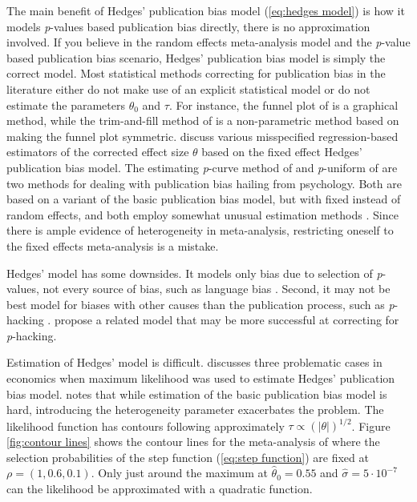 \documentclass[article]{ajs}
\numberwithin{equation}{section}
\numberwithin{figure}{section}
\theoremstyle{plain}
\theoremstyle{definition}
\theoremstyle{definition}
\theoremstyle{plain}
\renewcommand{\sqrt}[1]{{(#1)^{1/2}}}
\begin{document}
The main benefit of Hedges' publication bias model (\ref{eq:hedges model}) is how it models \textit{p}-values based publication bias directly, there is no approximation involved. If you believe in the random effects meta-analysis model and the \textit{p}-value based publication bias scenario, Hedges' publication bias model is simply the correct model. Most statistical methods correcting for publication bias in the literature either do not make use of an explicit statistical model or do not estimate the parameters $\theta_{0}$ and $\tau$. For instance, the funnel plot of \citet{Egger1997-rd} is a graphical method, while the trim-and-fill method of \citet{Duval2000-ct} is a non-parametric method based on making the funnel plot symmetric. \citet{Stanley2005-ng,stanley2014meta} discuss various misspecified regression-based estimators of the corrected effect size $\theta$ based on the fixed effect Hedges' publication bias model. The estimating \textit{p}-curve method of \citet{Simonsohn2014-cn} and \textit{p}-uniform of \citet{Van_Assen2015-qs,Van_Aert2016-cu} are two methods for dealing with publication bias hailing from psychology. Both are based on a variant of the basic publication bias model, but with fixed instead of random effects, and both employ somewhat unusual estimation methods \citep{McShane2016-rb}. Since there is ample evidence of heterogeneity in meta-analysis, restricting oneself to the fixed effects meta-analysis is a mistake.

Hedges' model has some downsides. It models only bias due to selection
of \textit{p}-values, not every source of bias, such as language bias
\citep{Egger1998-kj}. Second, it may not be best model for biases
with other causes than the publication process, such as \textit{p}-hacking
\citep{simmons2011false}. \citet{moss2019modelling} propose a related
model that may be more successful at correcting for \textit{p}-hacking. 

Estimation of Hedges' model is difficult. \citet[Section 6.3]{Stanley2005-ng}
discusses three problematic cases in economics when maximum likelihood
was used to estimate Hedges' publication bias model. \citet[Appendix A]{McShane2016-rb}
notes that while estimation of the basic publication bias model is
hard, introducing the heterogeneity parameter exacerbates the problem.
The likelihood function has contours following approximately $\tau\propto\sqrt{|\theta|}$.
Figure \ref{fig:contour lines} shows the contour lines for the meta-analysis
of \citet{Cuddy2018-kp} where the selection probabilities of the
step function (\ref{eq:step function}) are fixed at $\rho=(1,0.6,0.1)$.
Only just around the maximum at $\hat{\theta}_{0}=0.55$ and $\hat{\sigma}=5\cdot10^{-7}$
can the likelihood be approximated with a quadratic function. 
\end{document}
